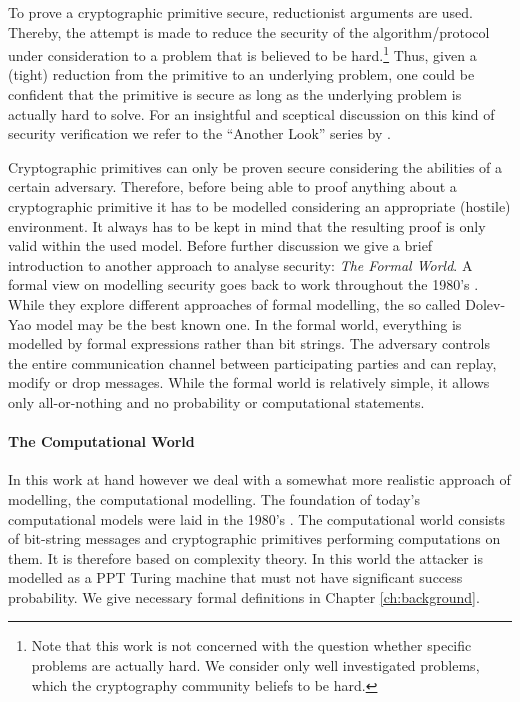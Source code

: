 To prove a cryptographic primitive secure, reductionist arguments are used.
Thereby, the attempt is made to reduce the security of the algorithm/protocol under consideration to a problem that is believed to be hard.\footnote{Note that this work is not concerned with the question whether specific problems are actually hard. We consider only well investigated problems, which the cryptography community beliefs to be hard.}
Thus, given a (tight) reduction from the primitive to an underlying problem, one could be confident that the primitive is secure as long as the underlying problem is actually hard to solve.
For an insightful and sceptical discussion on this kind of security verification we refer to the ``Another Look'' series by \citeauthor{AnotherLook} \cite{AnotherLook}.

Cryptographic primitives can only be proven secure considering the abilities of a certain adversary.
Therefore, before being able to proof anything about a cryptographic primitive it has to be modelled considering an appropriate (hostile) environment.
It always has to be kept in mind that the resulting proof is only valid within the used model.
Before further discussion we give a brief introduction to another approach to analyse security: \emph{The Formal World}.
A formal view on modelling security goes back to work throughout the 1980's \cite{DeMillo82,Dolev83,Millen87,Meadows91,Kemmerer1988,Burrows90}.
While they explore different approaches of formal modelling, the so called Dolev-Yao model \cite{Dolev83} may be the best known one.
In the formal world, everything is modelled by formal expressions rather than bit strings.
The adversary controls the entire communication channel between participating parties and can replay, modify or drop messages.
While the formal world is relatively simple, it allows only all-or-nothing  and no probability or computational statements.

\paragraph{The Computational World}
In this work at hand however we deal with a somewhat more realistic approach of modelling, the computational modelling.
The foundation of today's computational models were laid in the 1980's \cite{Goldwasser82,Goldwasser84,Yao82,Blum82}.
The computational world consists of bit-string messages and cryptographic primitives performing computations on them.
It is therefore based on complexity theory.
In this world the attacker is modelled as a \ac{PPT} Turing machine \cite{Turing37} that must not have significant success probability.
We give necessary formal definitions in Chapter \ref{ch:background}.

